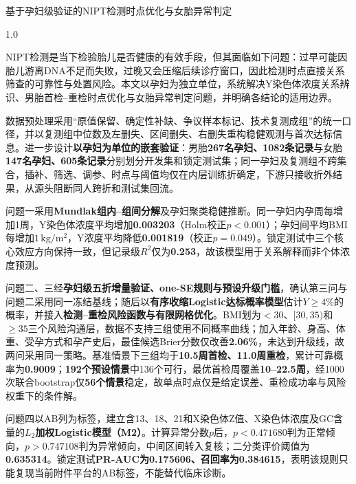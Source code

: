 \documentclass[12pt,a4paper]{ctexrep}
\numberwithin{equation}{section}
\newcommand{\song}{\songti}
\newcommand{\hei}{\heiti}
\begin{document}
	\newpage
	
	\begin{center}
		{\hei{}基于孕妇级验证的NIPT检测时点优化与女胎异常判定}
	\end{center}
	\noindent{\hei\zihao{-3}摘要}\par
	\vspace{11pt}
	
	\begin{spacing}{1.0}
		{\song{} \setlength{\parindent}{2em}
			NIPT检测是当下检验胎儿是否健康的有效手段，但其面临如下问题：过早可能因胎儿游离DNA不足而失败，过晚又会压缩后续诊疗窗口，因此检测时点直接关系筛查的可靠性与处置风险。本文以孕妇为独立单位，系统解决Y染色体浓度关系辨识、男胎首检--重检时点优化与女胎异常判定问题，并明确各结论的适用边界。

			数据预处理采用“原值保留、确定性补缺、争议样本标记、技术复测成组”的统一口径，并以复测组中位数及左删失、区间删失、右删失重构稳健观测与首次达标信息。进一步设计{\hei\bfseries 以孕妇为单位的嵌套验证}：男胎{\hei\bfseries 267名孕妇、1082条记录}与女胎{\hei\bfseries 147名孕妇、605条记录}分别划分开发集和锁定测试集；同一孕妇及复测组不跨集合，插补、筛选、调参、时点与阈值均仅在内层训练折确定，下游只接收折外结果，从源头阻断同人跨折和测试集回流。

			问题一采用{\hei\bfseries Mundlak组内--组间分解}及孕妇聚类稳健推断。同一孕妇内孕周每增加1周，Y染色体浓度平均增加{\hei\bfseries 0.003203}（Holm校正$p<0.001$）；孕妇间平均BMI每增加$1\,\mathrm{kg/m^2}$，Y浓度平均降低{\hei\bfseries 0.001819}（校正$p=0.049$）。锁定测试中三个核心效应方向保持一致，但记录级$R^2$仅为{\hei\bfseries 0.253}，故该模型用于关系解释而非个体浓度预测。

			问题二、三经{\hei\bfseries 孕妇级五折增量验证、one-SE规则与预设升级门槛}，确认第三问与问题二采用同一冻结基线；随后以{\hei\bfseries 有序收缩Logistic达标概率模型}估计$Y\geq4\%$的概率，并接入{\hei\bfseries 检测--重检风险函数与有限网格优化}。BMI划为$<30$、$[30,35)$和$\geq35$三个风险沟通层，数据不支持三组使用不同概率曲线；加入年龄、身高、体重、受孕方式和孕产史后，最佳候选Brier分数仅改善{\hei\bfseries 2.06\%}，未达到升级线，故两问采用同一策略。基准情景下三组均于{\hei\bfseries 10.5周首检、11.0周重检}，累计可靠概率为{\hei\bfseries 0.9009}；{\hei\bfseries 192个预设情景}中136个可行，最优首检周覆盖{\hei\bfseries 10--22.5周}，经1000次联合bootstrap仅{\hei\bfseries 56个情景}稳定，故单点时点仅是给定误差、重检成功率与风险权重下的条件解。

			问题四以AB列为标签，建立含13、18、21和X染色体Z值、X染色体浓度及GC含量的{\hei\bfseries $L_2$加权Logistic模型（M2）}。计算异常分数$p$后，$p<\mathbf{0.471680}$判为正常倾向，$p>\mathbf{0.747108}$判为异常倾向，中间区间转入复核；二分类评价阈值为{\hei\bfseries 0.635314}。锁定测试{\hei\bfseries PR-AUC为0.175606、召回率为0.384615}，表明该规则只能复现当前附件平台的AB标签，不能替代临床诊断。

}
\end{spacing}
\end{document}
